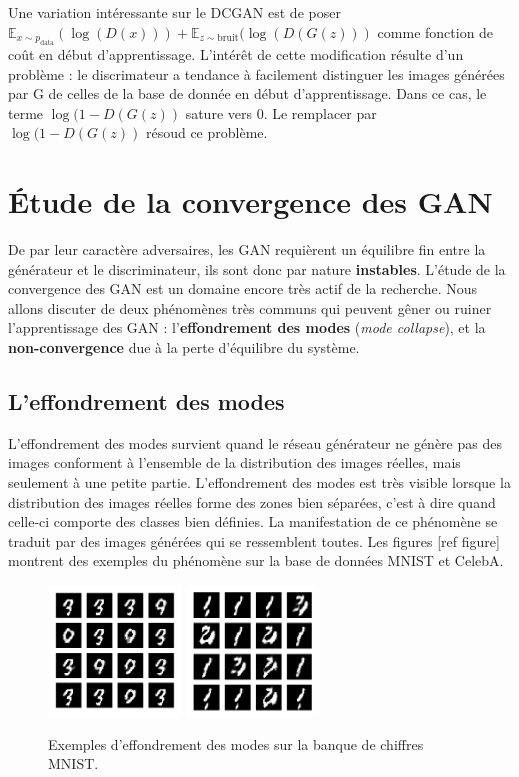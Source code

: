 Une variation intéressante sur le DCGAN est de poser $  \mathbb{E}_{x \sim p_{\mathrm{data}}}(\log (D(x))) + \mathbb{E}_{z \sim \mathrm{bruit}}(\log (D(G(z)))$ comme fonction de coût en début d'apprentissage. L'intérêt de cette modification résulte d'un problème : le discrimateur a tendance à facilement distinguer les images générées par G de celles de la base de donnée en début d'apprentissage. Dans ce cas, le terme $\log (1 - D(G(z))$ sature vers 0. Le remplacer par $\log (1 - D(G(z))$ résoud ce problème.


\section{Étude de la convergence des GAN}

De par leur caractère adversaires, les GAN requièrent un équilibre fin entre la générateur et le discriminateur, ils sont donc par nature \textbf{instables}. L'étude de la convergence des GAN est un domaine encore très actif de la recherche. Nous allons discuter de deux phénomènes très communs qui peuvent gêner ou ruiner l'apprentissage des GAN : l'\textbf{effondrement des modes} (\textit{mode collapse}), et la \textbf{non-convergence} due à la perte d'équilibre du système.

\subsection{L'effondrement des modes}

L'effondrement des modes survient quand le réseau générateur ne génère pas des images conforment à l'ensemble de la distribution des images réelles, mais seulement à une petite partie. L'effondrement des modes est très visible lorsque la distribution des images réelles forme des zones bien séparées, c'est à dire quand celle-ci comporte des classes bien définies. La manifestation de ce phénomène se traduit par des images générées qui se ressemblent toutes. Les figures [ref figure] montrent des exemples du phénomène sur la base de données MNIST et CelebA.

\begin{figure}[!h]
\centering
\includegraphics[width=100pt]{"images/collapseA_1"}
\includegraphics[width=100pt]{"images/collapseA_2"}
\caption{Exemples d’effondrement des modes sur la banque de chiffres MNIST.}
\end{figure}


